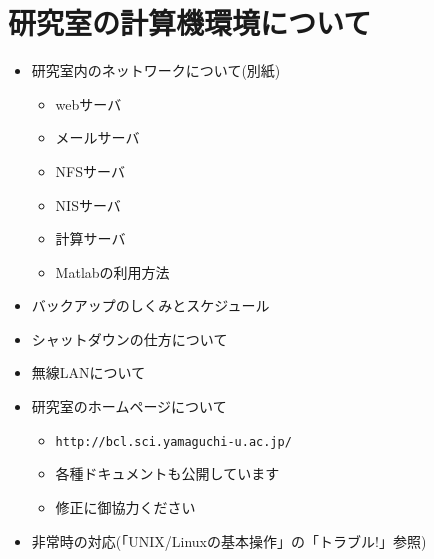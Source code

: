 \documentclass[twocolumn,11pt]{jsarticle}
\begin{document}
\section{研究室の計算機環境について\label{sec:comp}}
\begin{itemize}
\item 研究室内のネットワークについて(別紙)
  \begin{itemize}
  \item webサーバ
  \item メールサーバ
  \item NFSサーバ
  \item NISサーバ
  \item 計算サーバ
  \item Matlabの利用方法
  \end{itemize}
\item バックアップのしくみとスケジュール
\item シャットダウンの仕方について
\item 無線LANについて
\item 研究室のホームページについて
  \begin{itemize}
  \item \verb|http://bcl.sci.yamaguchi-u.ac.jp/|
  \item 各種ドキュメントも公開しています
  \item 修正に御協力ください
  \end{itemize}
\item 非常時の対応(「UNIX/Linuxの基本操作」の「トラブル!」参照)


\end{itemize}
\end{document}
